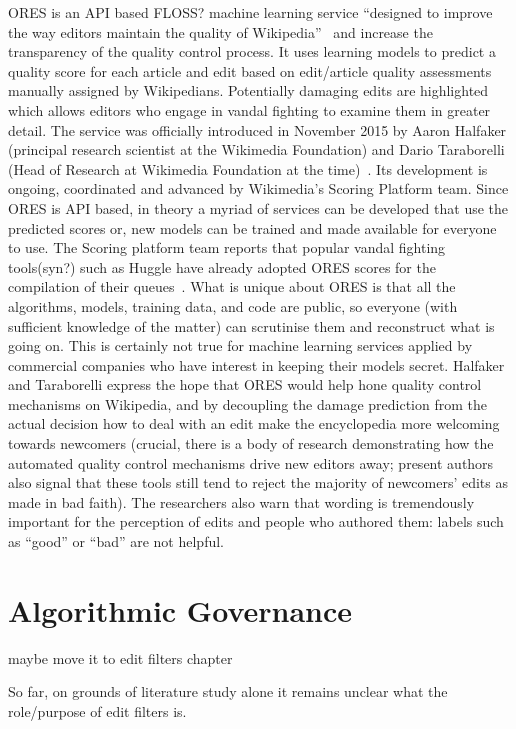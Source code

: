 ORES is an API based FLOSS? machine learning service ``designed to improve the way editors maintain the quality of Wikipedia''~\cite{HalTar2015} and increase the transparency of the quality control process.
It uses learning models to predict a quality score for each article and edit based on edit/article quality assessments manually assigned by Wikipedians.
Potentially damaging edits are highlighted which allows editors who engage in vandal fighting to examine them in greater detail.
The service was officially introduced in November 2015 by Aaron Halfaker (principal research scientist at the Wikimedia Foundation) and Dario Taraborelli (Head of Research at Wikimedia Foundation at the time)~\cite{HalTar2015}. %
Its development is ongoing, coordinated and advanced by Wikimedia's Scoring Platform team.
Since ORES is API based, in theory a myriad of services can be developed that use the predicted scores or, new models can be trained and made available for everyone to use.
The Scoring platform team reports that popular vandal fighting tools(syn?) such as Huggle have already adopted ORES scores for the compilation of their queues~\cite{HalTar2015}.
What is unique about ORES is that all the algorithms, models, training data, and code are public, so everyone (with sufficient knowledge of the matter) can scrutinise them and reconstruct what is going on.
This is certainly not true for machine learning services applied by commercial companies who have interest in keeping their models secret.
Halfaker and Taraborelli express the hope that ORES would help hone quality control mechanisms on Wikipedia, and by decoupling the damage prediction from the actual decision how to deal with an edit make the encyclopedia more welcoming towards newcomers
(crucial, there is a body of research demonstrating how the automated quality control mechanisms drive new editors away; present authors also signal that these tools still tend to reject the majority of newcomers' edits as made in bad faith).
The researchers also warn that wording is tremendously important for the perception of edits and people who authored them: labels such as ``good'' or ``bad'' are not helpful.


\section{Algorithmic Governance}

maybe move it to edit filters chapter


So far, on grounds of literature study alone it remains unclear what the role/purpose of edit filters is.
